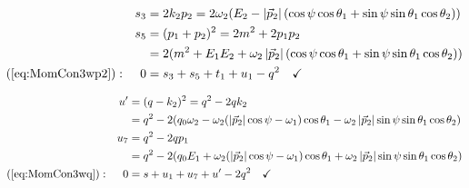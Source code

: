 \begin{align}
&&s_3 &= 2k_2p_2 = 2\omega_2(E_2-\left|\vec p_2\right|(\cos\psi\cos\theta_1+\sin\psi\sin\theta_1\cos\theta_2)) \label{eq:PSConIs3}\\
&&s_5 &= (p_1+p_2)^2 = 2m^2+2p_1p_2\\
&& &= 2(m^2+E_1E_2+\omega_2\left|\vec p_2\right|(\cos\psi\cos\theta_1+\sin\psi\sin\theta_1\cos\theta_2)) \label{eq:PSConIs5}\\
(\ref{eq:MomCon3wp2}): &&0 &= s_3+s_5+t_1+u_1-q^2\quad\checkmark
\end{align}

\begin{align}
&&u' &=(q-k_2)^2 = q^2-2qk_2\\
&& &= q^2-2(q_0\omega_2 -\omega_2(\left|\vec p_2\right|\cos\psi-\omega_1)\cos\theta_1-\omega_2\left|\vec p_2\right|\sin\psi\sin\theta_1\cos\theta_2)\\
&&u_7 &= q^2-2qp_1\\
&& &=q^2 - 2(q_0E_1 +\omega_2(\left|\vec p_2\right|\cos\psi-\omega_1)\cos\theta_1 + \omega_2\left|\vec p_2\right|\sin\psi\sin\theta_1\cos\theta_2)\\
(\ref{eq:MomCon3wq}): &&0 &=s+u_1+u_7+u'-2q^2\quad\checkmark
\end{align}

